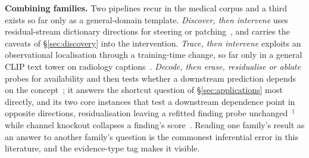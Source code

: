 \textbf{Combining families.} Two pipelines recur in the medical corpus and a third exists so far only as
a general-domain template. \emph{Discover, then intervene} uses residual-stream
dictionary directions for steering or
patching~\cite{bouzid2025insights,nooralahzadeh2026universal,sadanandan2026mechanistically}, and carries
the caveats of \S\ref{sec:discovery} into the intervention. \emph{Trace, then intervene} exploits an
observational localisation through a training-time change, so far only in a general CLIP text tower on
radiology captions~\cite{abbasi2026layerspecific}. \emph{Decode, then erase, residualise or ablate}
probes for availability and then tests whether a downstream prediction depends on the
concept~\cite{kim2026encoding,nooralahzadeh2026sparse,weber2023posthoc}; it answers the shortcut
question of \S\ref{sec:applications} most directly, and its two core instances that test a downstream
dependence point in opposite directions, residualisation leaving a refitted finding probe
unchanged~\cite{kim2026encoding}$^{\dagger}$ while channel knockout collapses a finding's
score~\cite{nooralahzadeh2026sparse}. Reading one family's result as an answer to another family's
question is the commonest inferential error in this literature, and the evidence-type tag makes it
visible.

